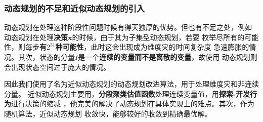 \documentclass[withoutpreface,bwprint]{cumcmthesis}
\begin{document}
\subsubsection*{动态规划的不足和近似动态规划的引入}
动态规划在处理这种阶段性问题时候有得天独厚的优势。但也有不足之处，例如
动态规划在处理\textbf{决策$\bm{x}$}的时候，由于其为子集型动态规划，若要
枚举尽所有的可能性，则每步\textbf{有$2^{31}$种可能性}，此时这会出现成为维度灾的时间复杂度
急速膨胀的情况。其次，状态的分量$I$是一个\textbf{连续的变量而不是离散的变量}，故使用
动态规划则会出现状态空间过于庞大的情况。\par
因此我们使用了名为近似动态规划\cite{RN10}的动态规划改进算法，用于处理维度灾和非连续分量。
近似动态规划主要用，\textbf{分段聚类估值函数}处理连续变量值，用\textbf{探索-开发行为}进行决策的缩减
，他完美的解决了动态规划在具体实现上的难点。其次，作为随机算法，近似动态规划
收敛快，能够较好的收敛到精确最优解。
\end{document}
